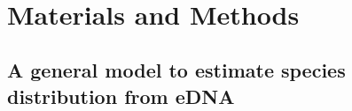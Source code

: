 \documentclass[12pt]{article}
\begin{document}
\begin{linenumbers}
\ \\

\section{Materials and Methods}


\subsection{A general model to estimate species distribution from eDNA}


\end{linenumbers}
\end{document}
